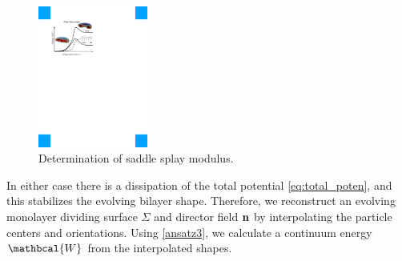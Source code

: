 \begin{figure}
\centerline{\includegraphics[width=0.32\textwidth]{Figures/SaddleSplayDiagram.pdf}}
\caption{\label{fig:saddle_splay} \footnotesize Determination of
  saddle splay modulus.}
\end{figure}
%
In either case there is a dissipation of the total potential \eqref{eq:total_poten}, and this stabilizes the evolving bilayer shape.
Therefore, we reconstruct an evolving monolayer dividing surface $\Sigma$ and director field ${\bf n}$ by
interpolating the particle centers and orientations. Using \eqref{ansatz3}, we calculate a continuum energy $\mathbcal{W}$ from the interpolated shapes.


%
%

